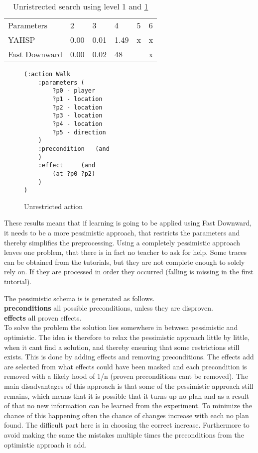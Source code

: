 \begin{table}
	\centering
	\caption{Unristrected search using level 1 and \ref{unrestricted}}
	\label{un-table}
	\begin{tabular}{llllll}
		Parameters & 2 & 3 & 4 & 5 & 6 \\
		YAHSP& 0.00 & 0.01  & 1.49 & x & x\\
		Fast Downward & 0.00 & 0.02 & 48 &  & x \\

	\end{tabular}
\end{table}
\begin{figure}
	\caption{Unrestricted action}
	\label{unrestricted}

\begin{lstlisting}
(:action Walk
	:parameters (
		?p0 - player
		?p1 - location
		?p2 - location
		?p3 - location
		?p4 - location
		?p5 - direction
	)
	:precondition 	(and
	)
	:effect 	(and
		(at ?p0 ?p2)
	)
)
\end{lstlisting}
\end{figure}


These results means that if learning is going to be applied using Fast Downward, it needs to be a more pessimistic approach, that restricts the parameters and thereby simplifies the preprocessing. Using a completely pessimistic approach leaves one problem, that there is in fact no teacher to ask for help. Some traces can be obtained from the tutorials, but they are not complete enough to solely rely on. If they are processed in order they occurred (falling is missing in the first tutorial).  

The pessimistic schema is is generated as follows.\\
\textbf{preconditions}
all possible preconditions, unless they are disproven.\\
\textbf{effects}
all proven effects.\\

To solve the problem the solution lies somewhere in between pessimistic and optimistic. The idea is therefore to relax the pessimistic approach little by little, when it cant find a solution, and thereby ensuring that some restrictions still exists. This is done by adding effects and removing preconditions. The effects add are selected from what effects could have been masked and each precondition is removed with a likely hood of 1/n (proven preconditions cant be removed). The main disadvantages of this approach is that some of the pessimistic approach still remains, which means that it is possible that it turns up no plan and as a result of that no new information can be learned from the experiment. To minimize the chance of this happening often the chance of changes increase with each no plan found. The difficult part here is in choosing the correct increase. Furthermore to avoid making the same the mistakes multiple times the preconditions from the optimistic approach is add.  

